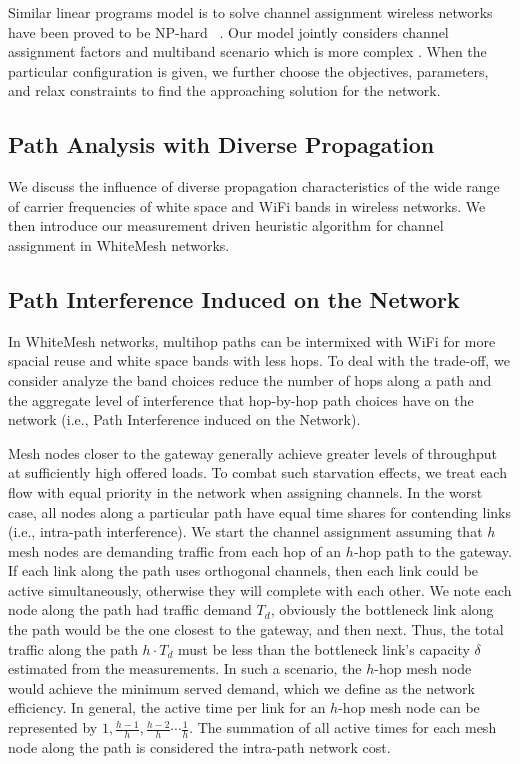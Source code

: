 Similar linear programs model is to solve channel assignment wireless networks have been proved to be NP-hard
~\cite{yuan2006cross}. Our model jointly considers channel assignment factors and multiband scenario which is more
complex . When the particular configuration is given, we further choose the objectives, parameters, and relax 
constraints to find the approaching solution for the network.  

%
\subsection{Path Analysis with Diverse Propagation}
\label{subsec:wmalgorithms}


We discuss the influence of diverse propagation characteristics of the wide range of carrier frequencies of
white space and WiFi bands in wireless networks. We then introduce our measurement driven heuristic algorithm 
for channel assignment in WhiteMesh networks.

%
\subsection{Path Interference Induced on the Network}
\label{subsec:PEN}

In WhiteMesh networks, multihop paths can be intermixed with WiFi for more spacial reuse and white space bands 
with less hops. To deal with the trade-off, we consider analyze the band choices reduce the number of hops along 
a path and the aggregate level of interference that hop-by-hop path choices have on the network (i.e., Path 
Interference induced on the Network).

Mesh nodes closer to the gateway generally achieve greater levels of throughput at sufficiently high offered loads. 
To combat such starvation effects, we treat each flow with equal priority in the network when assigning channels. 
In the worst case, all nodes along a particular path have equal time shares for contending links (i.e., intra-path 
interference). We start the channel assignment assuming that $h$ mesh nodes are demanding traffic from each hop of 
an $h$-hop path to the gateway. If each link along the path uses orthogonal channels, then each link could be active 
simultaneously, otherwise they will complete with each other. We note each node along the path had traffic demand 
$T_d$, obviously the bottleneck link along the path would be the one closest to the gateway, and then next. 
Thus, the total traffic along the path $h \cdot T_d$ must be less than the bottleneck link's capacity $\delta$ 
estimated from the measurements. In such a scenario, the $h$-hop mesh node would achieve the minimum served demand, 
which we define as the network efficiency. In general, the active time per link for an $h$-hop mesh node can be represented 
by $1,\frac{h-1}{h},\frac{h-2}{h}\cdots \frac{1}{h}$. The summation of all active times for each mesh node along the 
path is considered the intra-path network cost.

